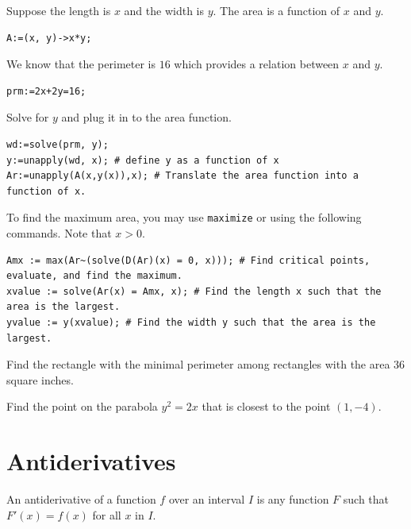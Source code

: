 \documentclass[en,11pt,simple]{elegantbook}
\let\BeginKnitrBlock\begin \let\EndKnitrBlock\end
\begin{document}
\BeginKnitrBlock{solution}{}{}
{}
Suppose the length is \(x\) and the width is \(y\). The area is a function of \(x\) and \(y\).

\begin{verbatim}
A:=(x, y)->x*y;
\end{verbatim}

We know that the perimeter is \(16\) which provides a relation between \(x\) and \(y\).

\begin{verbatim}
prm:=2x+2y=16;
\end{verbatim}

Solve for \(y\) and plug it in to the area function.

\begin{verbatim}
wd:=solve(prm, y);
y:=unapply(wd, x); # define y as a function of x
Ar:=unapply(A(x,y(x)),x); # Translate the area function into a function of x.
\end{verbatim}

To find the maximum area, you may use \texttt{maximize} or using the following commands. Note that \(x>0\).

\begin{verbatim}
Amx := max(Ar~(solve(D(Ar)(x) = 0, x))); # Find critical points, evaluate, and find the maximum.
xvalue := solve(Ar(x) = Amx, x); # Find the length x such that the area is the largest. 
yvalue := y(xvalue); # Find the width y such that the area is the largest.
\end{verbatim}
\EndKnitrBlock{solution}

\BeginKnitrBlock{exercise}{}{}
\protect\hypertarget{exr:unnamed-chunk-124}{}{\label{exr:unnamed-chunk-124} }
Find the rectangle with the minimal perimeter among rectangles with the area 36 square inches.
\EndKnitrBlock{exercise}

\BeginKnitrBlock{exercise}{}{}
\protect\hypertarget{exr:unnamed-chunk-125}{}{\label{exr:unnamed-chunk-125} }
Find the point on the parabola \(y^2=2x\) that is closest to the point \((1, -4)\).
\EndKnitrBlock{exercise}

\hypertarget{antiderivatives}{%
\section{Antiderivatives}\label{antiderivatives}}

An antiderivative of a function \(f\) over an interval \(I\) is any function \(F\) such that \(F'(x)=f(x)\) for all \(x\) in \(I\).
\end{document}
